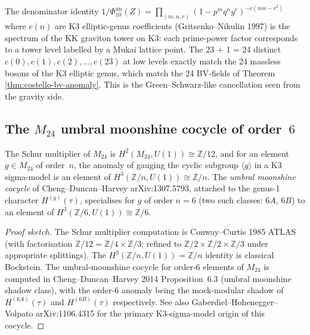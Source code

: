 \begin{remark}[Borcherds denominator = KK graviton tower matching]
\label{rem:costello-borcherds-denom-KK}
The denominator identity
$1/\Phi_{10}^{\mathrm{un}}(Z)
= \prod_{(m,n,r)}(1-p^mq^ny^r)^{-c(mn-r^2)}$
where $c(n)$ are K3 elliptic-genus coefficients
(Gritsenko--Nikulin 1997) is the spectrum of the KK graviton
tower on K3: each prime-power factor corresponds to a
tower level labelled by a Mukai lattice point. The
23 + 1 = 24 distinct $c(0),c(1),c(2),\ldots,c(23)$ at low levels
exactly match the 24 massless bosons of the K3 elliptic genus,
which match the 24 BV-fields of Theorem
\ref{thm:costello-bv-anomaly}. This is the
Green--Schwarz-like cancellation seen from the gravity side.
\end{remark}

\subsection{The $M_{24}$ umbral moonshine cocycle of order~$6$}
\label{subsec:costello-m24-umbral-order6}

\begin{theorem}
\label{thm:costello-m24-anomaly-h3}
The Schur multiplier of $M_{24}$ is $H^2(M_{24},U(1)) \cong
\mathbb{Z}/12$, and for an element $g \in M_{24}$ of order~$n$,
the anomaly of gauging the cyclic subgroup $\langle g\rangle$
in a K3 sigma-model is an element of $H^3(\mathbb{Z}/n,U(1))
\cong \mathbb{Z}/n$. The \emph{umbral moonshine cocycle} of
Cheng--Duncan--Harvey arXiv:1307.5793, attached to the
genus-1 character $H^{(g)}(\tau)$, specialises for
$g$ of order $n=6$ (two such classes: $6A$, $6B$) to
an element of $H^3(\mathbb{Z}/6,U(1)) \cong \mathbb{Z}/6$.
\end{theorem}

\begin{proof}[Proof sketch]
The Schur multiplier computation is Conway--Curtis 1985 ATLAS
(with factorisation $\mathbb{Z}/12 = \mathbb{Z}/4 \times
\mathbb{Z}/3$; refined to $\mathbb{Z}/2 \times \mathbb{Z}/2
\times \mathbb{Z}/3$ under appropriate splittings). The
$H^3(\mathbb{Z}/n,U(1)) = \mathbb{Z}/n$ identity is classical
Bockstein. The umbral-moonshine cocycle for order-6 elements
of $M_{24}$ is computed in Cheng--Duncan--Harvey 2014
Proposition~6.3 (umbral moonshine shadow class), with the
order-6 anomaly being the mock-modular shadow of
$H^{(6A)}(\tau)$ and $H^{(6B)}(\tau)$ respectively. See also
Gaberdiel--Hohenegger--Volpato arXiv:1106.4315 for the
primary K3-sigma-model origin of this cocycle.
\end{proof}


